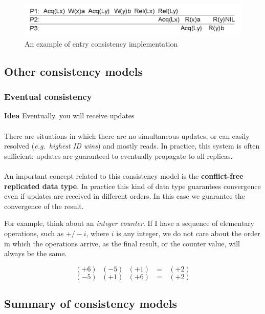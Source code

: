 \begin{figure}[htbp]
    \centering
    \includegraphics[width=\textwidth]{src/images/consistency-replication/entry-consistency.png}
    \caption{An example of entry consistency implementation}
\end{figure}

\subsection{Other consistency models}
\subsubsection{Eventual consistency}

\textbf{Idea} Eventually, you will receive updates\\
\\
There are situations in which there are no simultaneous
updates, or can easily resolved (\emph{e.g.~highest ID wins}) and mostly
reads. In practice, this system is often sufficient: updates are guaranteed to
eventually propagate to all replicas.\\
\\
An important concept related to this consistency model is the \textbf{conflict-free replicated data type}.
In practice this kind of data type guarantees convergence even
if updates are received in different orders. In this case we guarantee
the convergence of the result.

For example, think about an \emph{integer counter}. If I have a sequence of elementary operations, such as
$+/- i$, where $i$ is any integer, we do not care about the order in which the operations arrive, 
as the final result, or the counter value, will always be the same.

\begin{equation*}
    (+6) \text{   } (-5) \text{   } (+1) \text{   } = \text{   } (+2)
\end{equation*}
\begin{equation*}
    (-5) \text{   } (+1) \text{   } (+6) \text{   } = \text{   } (+2)
\end{equation*}

\subsection{Summary of consistency models}

